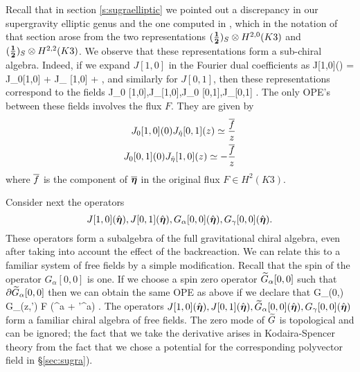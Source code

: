 \documentclass[../main.tex]{subfiles}
\begin{document}
Recall that in section \ref{s:sugraelliptic} we pointed out a discrepancy in our supergravity elliptic genus and the one computed in \cite{deBoerEG}, which in the notation of that section arose from the two representations $(\frac{\bf 1}{\bf 2})_S \otimes H^{2,0}(K3)$ and $(\frac{\bf 1}{\bf 2})_S \otimes H^{2,2}(K3)$.
We observe that these representations form a sub-chiral algebra. 
Indeed, if we expand $J[1,0]$ in the Fourier dual coefficients as
\beqn
J[1,0](\what \bfeta) = J_0[1,0] + \what \eta J_{\what \eta} [1,0] + \cdots ,
\eeqn
and similarly for $J[0,1]$, then these representations correspond to the fields 
\beqn
J_0 [1,0],J_{\what \eta}[1,0],J_0 [0,1],J_{\what \eta}[0,1] .
\eeqn
The only OPE's between these fields involves the flux $F$.
They are given by
\begin{align*}
J_0 [1,0](0) J_{\Hat \eta} [0,1] (z) \simeq \frac{\overline f}{z}  \\ 
J_0[0,1] (0) J_{\Hat \eta} [1,0] (z) \simeq - \frac{\overline f}{z} 
\end{align*}
where $\overline f$ is the component of $\overline {\boldsymbol\eta}$ in the original flux $F \in H^2(K3)$.

Consider next the operators 
\[
J[1,0](\Hat {\boldsymbol\eta}), J[0,1](\Hat {\boldsymbol\eta}),G_\alpha[0,0](\Hat {\boldsymbol\eta}), G_\gamma[0,0](\Hat {\boldsymbol\eta}) .
\]
These operators form a subalgebra of the full gravitational chiral algebra, even after taking into account the effect of the backreaction.
We can relate this to a familiar system of free fields by a simple modification.
Recall that the spin of the operator $G_\alpha[0,0]$ is one.
If we choose a spin zero operator $\widetilde G_{\alpha}[0,0]$ such that $\partial \widetilde G_\alpha [0,0]$ then we can obtain the same OPE as above if we declare that 
\beqn
\til G_\alpha[0,0](0,\what \bfeta) G_\gamma[0,0](z,\what \bfeta') \simeq {} \what F (\what \bfeta^a + \what \bfeta'^a) .
\eeqn
The operators $J[1,0](\Hat {\boldsymbol\eta}), J[0,1](\Hat {\boldsymbol\eta}),\widetilde G_\alpha[0,0](\Hat {\boldsymbol\eta}), G_\gamma[0,0](\Hat {\boldsymbol\eta})$ form a familiar chiral algebra of free fields. 
The zero mode of $\widetilde G$ is topological and can be ignored; the fact that we take the derivative arises in Kodaira-Spencer theory from the fact that we chose a potential for the corresponding polyvector field in \S \ref{sec:sugra}).
\end{document}
